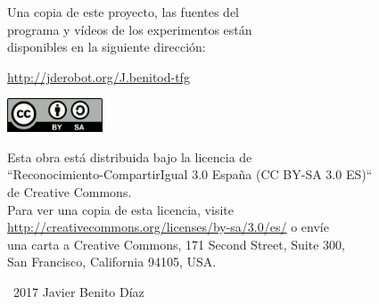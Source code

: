 \thispagestyle{empty}

\vspace*{10cm}

\begin{flushright}
Una copia de este proyecto, las fuentes del\\
programa y vídeos de los experimentos están\\ 
disponibles en la siguiente dirección:\\

\vspace*{0.5cm}

\href{http://jderobot.org/J.benitod-tfg}{http://jderobot.org/J.benitod-tfg}
\end{flushright}
\vspace*{3cm}

\begin{flushright}

\includegraphics[height=1.0cm]{license-by-sa.png} \\
\vspace*{0.3cm}

Esta obra está distribuida bajo la licencia de \\
``Reconocimiento-CompartirIgual 3.0 España (CC BY-SA 3.0 ES)``\\
de Creative Commons.\\ \vspace{0.2cm}
Para ver una copia de esta licencia, visite \\
\href{http://creativecommons.org/licenses/by-sa/3.0/es/}{http://creativecommons.org/licenses/by-sa/3.0/es/} o env\'ie \\
una carta a Creative Commons, 171 Second Street, Suite 300, \\
San Francisco, California 94105, USA.

\vspace*{0.5cm}

\ccLogo\, 2017 Javier Benito Díaz

\end{flushright}